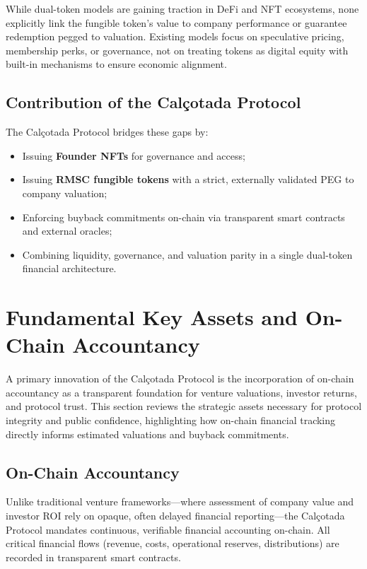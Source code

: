 \documentclass[conference]{IEEEtran}
\begin{document}
While dual-token models are gaining traction in DeFi and NFT ecosystems, none explicitly link the fungible token’s value to company performance or guarantee redemption pegged to valuation. Existing models focus on speculative pricing, membership perks, or governance, not on treating tokens as digital equity with built-in mechanisms to ensure economic alignment.

\subsection{Contribution of the Calçotada Protocol}

The Calçotada Protocol bridges these gaps by:

\begin{itemize}
    \item Issuing \textbf{Founder NFTs} for governance and access;
    \item Issuing \textbf{RMSC fungible tokens} with a strict, externally validated PEG to company valuation;
    \item Enforcing buyback commitments on-chain via transparent smart contracts and external oracles;
    \item Combining liquidity, governance, and valuation parity in a single dual-token financial architecture.
\end{itemize}



\section{Fundamental Key Assets and On-Chain Accountancy}
A primary innovation of the Calçotada Protocol is the incorporation of on-chain accountancy as a transparent foundation for venture valuations, investor returns, and protocol trust. This section reviews the strategic assets necessary for protocol integrity and public confidence, highlighting how on-chain financial tracking directly informs estimated valuations and buyback commitments.

\subsection{On-Chain Accountancy}
Unlike traditional venture frameworks—where assessment of company value and investor ROI rely on opaque, often delayed financial reporting—the Calçotada Protocol mandates continuous, verifiable financial accounting on-chain. All critical financial flows (revenue, costs, operational reserves, distributions) are recorded in transparent smart contracts.
\end{document}
